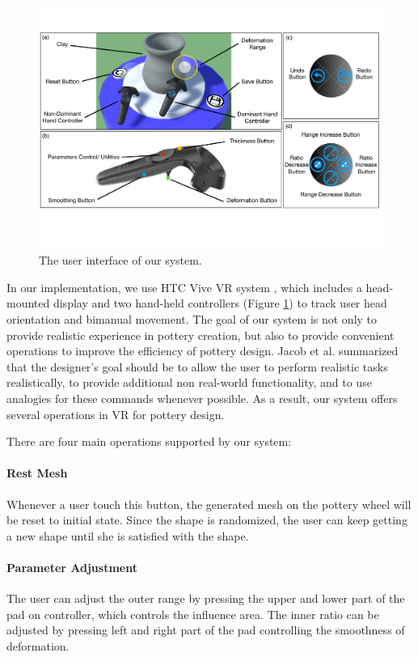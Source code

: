 \documentclass{svjour3}                     %
\begin{document}
\begin{figure}
\includegraphics[width=\textwidth]{ui}
\caption{The user interface of our system.}
\label{fig:ui}
\end{figure}

In our implementation, we use HTC Vive VR system \cite{website:vive}, which includes a head-mounted display and two hand-held controllers (Figure \ref{fig:ui}) to track user head orientation and bimanual movement.
The goal of our system is not only to provide realistic experience in pottery creation, but also to provide convenient operations to improve the efficiency of pottery design. 
Jacob et al. \cite{Jacob2008Reality} summarized that the designer's goal should be to allow the user to perform realistic tasks realistically, to provide additional non real-world functionality, and to use analogies for these commands whenever possible.
As a result, our system offers several operations in VR for pottery design.


There are four main operations supported by our system:

\paragraph{Rest Mesh}
Whenever a user touch this button, the generated mesh on the pottery wheel will be reset to initial state. Since the shape is randomized, the user can keep getting a new shape until she is satisfied with the shape.

\paragraph{Parameter Adjustment}
The user can adjust the outer range by pressing the upper and lower part of the pad on controller, which controls the influence area. The inner ratio can be adjusted by pressing left and right part of the pad controlling the smoothness of deformation.
\end{document}
